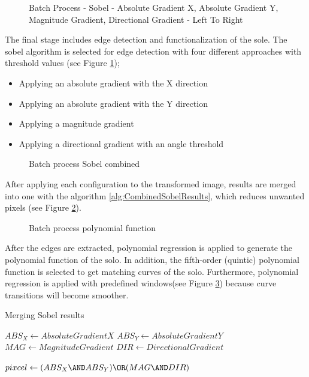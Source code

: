 \begin{figure}[htbp]
\centering
{}
\caption{Batch Process - Sobel - Absolute Gradient X, Absolute Gradient Y, Magnitude Gradient, Directional Gradient - Left To Right}
\label{fig:BatchProcessSobelOutput}
\end{figure}

The final stage includes edge detection and functionalization of the sole. The sobel algorithm is selected for edge detection with four different approaches with threshold values (see Figure \ref{fig:BatchProcessSobelOutput});

\begin{itemize}
  \item Applying an absolute gradient with the X direction
  \item Applying an absolute gradient with the Y direction
  \item Applying a magnitude gradient
  \item Applying a directional gradient with an angle threshold 
\end{itemize}

\begin{figure}[htbp]
\centering
{}
\caption{Batch process Sobel combined}
\label{fig:BatchProcessEdge}
\end{figure}

After applying each configuration to the transformed image, results are merged into one with the algorithm \ref{alg:CombinedSobelResults}, which reduces unwanted pixels (see Figure \ref{fig:BatchProcessEdge}). 

\begin{figure}[htbp]
\centering
{}
\caption{Batch process polynomial function}
\label{fig:BatchProcessLine}
\end{figure}

After the edges are extracted, polynomial regression is applied to generate the polynomial function of the solo. In addition, the fifth-order (quintic) polynomial function is selected to get matching curves of the solo. Furthermore, polynomial regression is applied with predefined windows(see Figure \ref{fig:BatchProcessLine}) because curve transitions will become smoother.

\begin{algorithm}
\caption{Merging Sobel results}\label{alg:CombinedSobelResults}
\begin{algorithmic}

\STATE $ABS_X \gets Absolute Gradient X$
\STATE $ABS_Y \gets Absolute Gradient Y$
\STATE $MAG \gets Magnitude Gradient$
\STATE $DIR \gets Directional Gradient$

    \STATE $pixcel \gets (ABS_X \AND ABS_Y) \OR (MAG \AND DIR)$
\ENDFOR

\end{algorithmic}
\end{algorithm}

